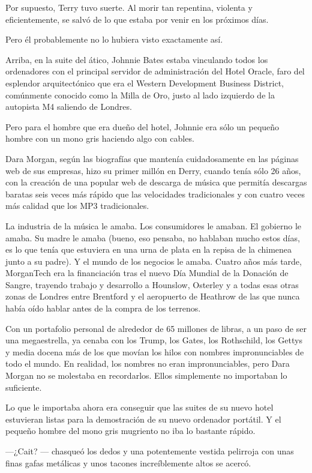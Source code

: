 Por supuesto, Terry tuvo suerte. Al morir tan repentina, violenta y
eficientemente, se salvó de lo que estaba por venir en los próximos
días.

Pero él probablemente no lo hubiera visto exactamente así.

Arriba, en la suite del ático, Johnnie Bates estaba vinculando todos los
ordenadores con el principal servidor de administración del Hotel
Oracle, faro del esplendor arquitectónico que era el Western Development
Business District, comúnmente conocido como la Milla de Oro, justo al
lado izquierdo de la autopista M4 saliendo de Londres.

Pero para el hombre que era dueño del hotel, Johnnie era sólo un pequeño
hombre con un mono gris haciendo algo con cables.

Dara Morgan, según las biografías que mantenía cuidadosamente en las
páginas web de sus empresas, hizo su primer millón en Derry, cuando
tenía sólo 26 años, con la creación de una popular web de descarga de
música que permitía descargas baratas seis veces más rápido que las
velocidades tradicionales y con cuatro veces más calidad que los MP3
tradicionales.

La industria de la música le amaba. Los consumidores le amaban. El
gobierno le amaba. Su madre le amaba (bueno, eso pensaba, no hablaban
mucho estos días, es lo que tenía que estuviera en una urna de plata en
la repisa de la chimenea junto a su padre). Y el mundo de los negocios
le amaba. Cuatro años más tarde, MorganTech era la financiación tras el
nuevo Día Mundial de la Donación de Sangre, trayendo trabajo y
desarrollo a Hounslow, Osterley y a todas esas otras zonas de Londres
entre Brentford y el aeropuerto de Heathrow de las que nunca había oído
hablar antes de la compra de los terrenos.

Con un portafolio personal de alrededor de 65 millones de libras, a un
paso de ser una megaestrella, ya cenaba con los Trump, los Gates, los
Rothschild, los Gettys y media docena más de los que movían los hilos
con nombres impronunciables de todo el mundo. En realidad, los nombres
no eran impronunciables, pero Dara Morgan no se molestaba en
recordarlos. Ellos simplemente no importaban lo suficiente.

Lo que le importaba ahora era conseguir que las suites de su nuevo hotel
estuvieran listas para la demostración de su nuevo ordenador portátil. Y
el pequeño hombre del mono gris mugriento no iba lo bastante rápido.

---¿Cait? --- chasqueó los dedos y una potentemente vestida pelirroja
con unas finas gafas metálicas y unos tacones increíblemente altos se
acercó.

